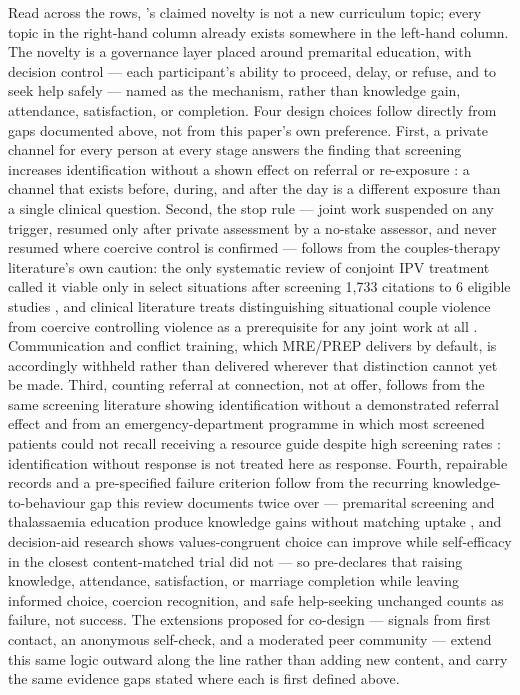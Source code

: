 Read across the rows, \tphe{}'s claimed novelty is not a new curriculum topic; every topic in the
right-hand column already exists somewhere in the left-hand column. The novelty is a governance
layer placed around premarital education, with decision control --- each participant's ability to
proceed, delay, or refuse, and to seek help safely --- named as the mechanism, rather than
knowledge gain, attendance, satisfaction, or completion. Four design choices follow directly from
gaps documented above, not from this paper's own preference. First, a private channel for every
person at every stage answers the finding that screening increases identification without a shown
effect on referral or re-exposure \cite{ref38,ref39}: a channel that exists before, during, and
after the day is a different exposure than a single clinical question. Second, the stop rule --- joint
work suspended on any trigger, resumed only after private assessment by a no-stake assessor, and
never resumed where coercive control is confirmed --- follows from the couples-therapy literature's
own caution: the only systematic review of conjoint IPV treatment called it viable only in select
situations after screening 1{,}733 citations to 6 eligible studies \cite{ref45}, and clinical
literature treats distinguishing situational couple violence from coercive controlling violence as a
prerequisite for any joint work at all \cite{ref46,ref47}. Communication and conflict training,
which MRE/PREP delivers by default, is accordingly withheld rather than delivered wherever that
distinction cannot yet be made. Third, counting referral at connection, not at offer, follows from
the same screening literature showing identification without a demonstrated referral effect
\cite{ref38,ref41} and from an emergency-department programme in which most screened patients could
not recall receiving a resource guide despite high screening rates \cite{ref173}: identification
without response is not treated here as response. Fourth, repairable records and a pre-specified
failure criterion follow from the recurring knowledge-to-behaviour gap this review documents twice
over --- premarital screening and thalassaemia education produce knowledge gains without matching
uptake \cite{ref12,ref13}, and decision-aid research shows values-congruent choice can improve while
self-efficacy in the closest content-matched trial did not \cite{ref14,ref120} --- so \tphe{}
pre-declares that raising knowledge, attendance, satisfaction, or marriage completion while leaving
informed choice, coercion recognition, and safe help-seeking unchanged counts as failure, not
success. The extensions proposed for co-design --- signals from first contact, an anonymous
self-check, and a moderated peer community --- extend this same logic outward along the line rather
than adding new content, and carry the same evidence gaps stated where each is first defined
above.

